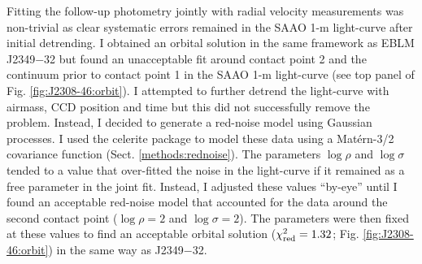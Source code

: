 Fitting the follow-up photometry jointly with radial velocity measurements was non-trivial as clear systematic errors remained in the SAAO 1-m light-curve after initial detrending. I obtained an orbital solution in the same framework as EBLM J2349$-$32  but found an unacceptable fit around contact point 2 and the continuum prior to contact point 1 in the SAAO 1-m light-curve (see top panel of  Fig. \ref{fig:J2308-46:orbit}). I attempted to further detrend the light-curve with airmass, CCD position and time but this did not successfully remove the problem. Instead, I decided to generate a red-noise model using Gaussian processes. I used the {\sc celerite} package to model these data using a Mat\'{e}rn-3/2 covariance function (Sect. \ref{methods:rednoise}). The parameters $\log \rho$ and $\log \sigma$ tended to a value that over-fitted the noise in the light-curve if it remained as a free parameter in the joint fit. Instead, I adjusted these values ``by-eye'' until I found an acceptable red-noise model that accounted for the data around the second contact point ($\log \rho=2$ and  $\log \sigma=2$). The parameters were then fixed at these values to find an acceptable orbital solution ($\chi_{\rm red}^2 = 1.32$; Fig. \ref{fig:J2308-46:orbit}) in the same way as J2349$-$32.


